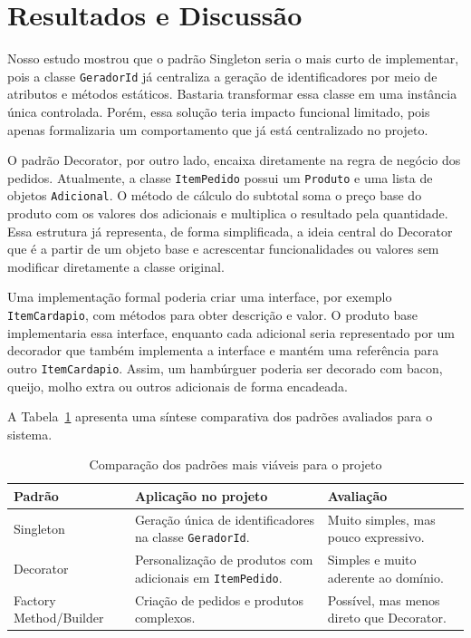 \documentclass[12pt]{article}
\begin{document}
\section{Resultados e Discussão}

Nosso estudo mostrou que o padrão Singleton seria o mais curto de implementar, pois a classe \texttt{GeradorId} já centraliza a geração de identificadores por meio de atributos e métodos estáticos. Bastaria transformar essa classe em uma instância única controlada. Porém, essa solução teria impacto funcional limitado, pois apenas formalizaria um comportamento que já está centralizado no projeto.

O padrão Decorator, por outro lado, encaixa diretamente na regra de negócio dos pedidos. Atualmente, a classe \texttt{ItemPedido} possui um \texttt{Produto} e uma lista de objetos \texttt{Adicional}. O método de cálculo do subtotal soma o preço base do produto com os valores dos adicionais e multiplica o resultado pela quantidade. Essa estrutura já representa, de forma simplificada, a ideia central do Decorator que é a partir de um objeto base e acrescentar funcionalidades ou valores sem modificar diretamente a classe original.

Uma implementação formal poderia criar uma interface, por exemplo \texttt{ItemCardapio}, com métodos para obter descrição e valor. O produto base implementaria essa interface, enquanto cada adicional seria representado por um decorador que também implementa a interface e mantém uma referência para outro \texttt{ItemCardapio}. Assim, um hambúrguer poderia ser decorado com bacon, queijo, molho extra ou outros adicionais de forma encadeada.

A Tabela~\ref{tab:comparacao} apresenta uma síntese comparativa dos padrões avaliados para o sistema.

\begin{table}[ht]
\centering
\caption{Comparação dos padrões mais viáveis para o projeto}
\label{tab:comparacao}
\begin{tabular}{p{3.2cm}p{7.6cm}p{2.7cm}}
\hline
\textbf{Padrão} & \textbf{Aplicação no projeto} & \textbf{Avaliação} \\
\hline
Singleton & Geração única de identificadores na classe \texttt{GeradorId}. & Muito simples, mas pouco expressivo. \\
Decorator & Personalização de produtos com adicionais em \texttt{ItemPedido}. & Simples e muito aderente ao domínio. \\
Factory Method/Builder & Criação de pedidos e produtos complexos. & Possível, mas menos direto que Decorator. \\
\hline
\end{tabular}
\end{table}
\end{document}
